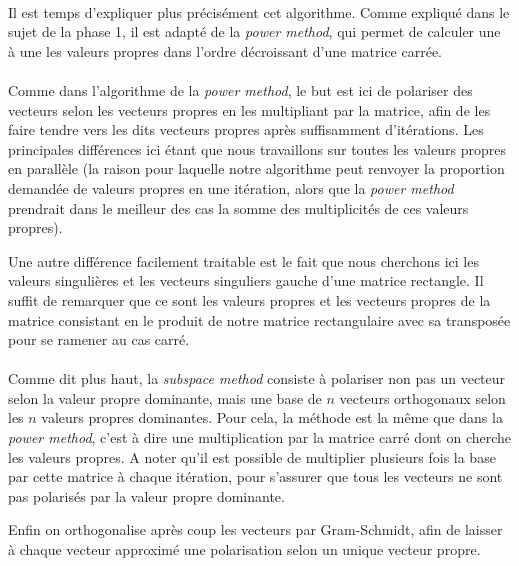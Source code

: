 \documentclass[a4paper,12pt]{article}
\begin{document}
\newpage

    \paragraph{}
    Il est temps d'expliquer plus précisément cet algorithme. Comme
    expliqué dans le sujet de la phase 1, il est adapté de la \emph{power
    method}, qui permet de calculer une à une les valeurs propres dans
    l'ordre décroissant d'une matrice carrée.

    \paragraph{}
    Comme dans l'algorithme de la \emph{power method}, le but est ici de
    polariser des vecteurs selon les vecteurs propres en les multipliant
    par la matrice, afin de les faire tendre vers les dits vecteurs propres
    après suffisamment d'itérations. Les principales différences ici étant
    que nous travaillons sur toutes les valeurs propres en parallèle (la
    raison pour laquelle notre algorithme peut renvoyer la proportion demandée
    de valeurs propres en une itération, alors que la \emph{power method} prendrait
    dans le meilleur des cas la somme des multiplicités de ces valeurs propres).

    Une autre différence facilement traitable est le fait que nous cherchons ici
    les valeurs singulières et les vecteurs singuliers gauche d'une matrice
    rectangle. Il suffit de remarquer que ce sont les valeurs propres et les
    vecteurs propres de la matrice consistant en le produit de notre
    matrice rectangulaire avec sa transposée pour se ramener au cas carré.

    \paragraph{}
    Comme dit plus haut, la \emph{subspace method} consiste à polariser non pas
    un vecteur selon la valeur propre dominante, mais une base de $n$ vecteurs
    orthogonaux selon les $n$ valeurs propres dominantes. Pour cela, la méthode
    est la même que dans la \emph{power method}, c'est à dire une multiplication par
    la matrice carré dont on cherche les valeurs propres. A noter qu'il est
    possible de multiplier plusieurs fois la base par cette matrice à chaque
    itération, pour s'assurer que tous les vecteurs ne sont pas polarisés par
    la valeur propre dominante.

    Enfin on orthogonalise après coup les vecteurs par Gram-Schmidt,
    afin de laisser à chaque vecteur \og approximé \fg une polarisation selon un unique vecteur
    propre.
\end{document}
